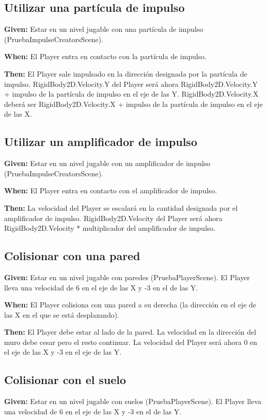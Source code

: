 \subsection{Utilizar una partícula de impulso}
\textbf{Given:} Estar en un nivel jugable con una partícula de impulso (PruebaImpulseCreatorsScene).

\textbf{When:} El Player entra en contacto con la partícula de impulso.

\textbf{Then:} El Player sale impulsado en la dirección designada por la partícula de impulso. RigidBody2D.Velocity.Y del Player será ahora RigidBody2D.Velocity.Y + impulso de la partícula de impulso en el eje de las Y. RigidBody2D.Velocity.X deberá ser RigidBody2D.Velocity.X + impulso de la partícula de impulso en el eje de las X.

\subsection{Utilizar un amplificador de impulso}
\textbf{Given:} Estar en un nivel jugable con un amplificador de impulso (PruebaImpulseCreatorsScene).

\textbf{When:} El Player entra en contacto con el amplificador de impulso.

\textbf{Then:} La velocidad del Player se escalará en la cantidad designada por el amplificador de impulso. RigidBody2D.Velocity del Player será ahora RigidBody2D.Velocity * multiplicador del amplificador de impulso.

\subsection{Colisionar con una pared}
\textbf{Given:} Estar en un nivel jugable con paredes (PruebaPlayerScene). El Player lleva una velocidad de 6 en el eje de las X y -3 en el de las Y.

\textbf{When:} El Player colisiona con una pared a su derecha (la dirección en el eje de las X en el que se está desplazando).

\textbf{Then:} El Player debe estar al lado de la pared. La velocidad en la dirección del muro debe cesar pero el resto continuar. La velocidad del Player será ahora 0 en el eje de las X y -3 en el eje de las Y.

\subsection{Colisionar con el suelo}
\textbf{Given:} Estar en un nivel jugable con suelos (PruebaPlayerScene). El Player lleva una velocidad de 6 en el eje de las X y -3 en el de las Y.

